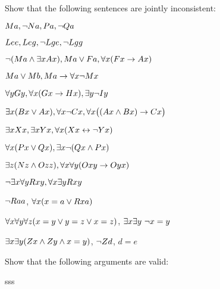 \problempart
Show that the following sentences are jointly inconsistent:
\begin{earg}
\item $Ma, \neg Na, Pa, \neg Qa$
\item $Lee, Leg, \neg Lge, \neg Lgg$
\item $\neg (Ma \wedge \exists x Ax), Ma \vee Fa, \forall x(Fx \rightarrow Ax)$
\item $Ma \vee Mb, Ma \rightarrow \forall x \neg Mx$
\item $\forall y Gy, \forall x (Gx \rightarrow Hx), \exists y \neg Iy$
\item $\exists x(Bx \vee Ax), \forall x \neg Cx, \forall x\bigl( (Ax \wedge Bx) \rightarrow Cx\bigr)$
\item $\exists x Xx, \exists x Yx, \forall x(Xx \leftrightarrow \neg Yx)$
\item $\forall x(Px \vee Qx), \exists x\neg(Qx \wedge Px)$
\item $\exists z(Nz \wedge Ozz), \forall x\forall y(Oxy \rightarrow Oyx)$
\item $\neg \exists x \forall y Rxy, \forall x \exists y Rxy$
\item $\neg Raa$, $\forall x (x=a \vee Rxa)$
\item $\forall x\forall y\forall z(x=y \vee y=z \vee x=z)$, $\exists x\exists y\ \neg x= y$
\item $\exists x\exists y(Zx \wedge Zy \wedge x=y)$, $\neg Zd$, $d=e$
\end{earg}

\problempart
Show that the following arguments are valid:
\begin{earg}
\item sss
\end{earg}
